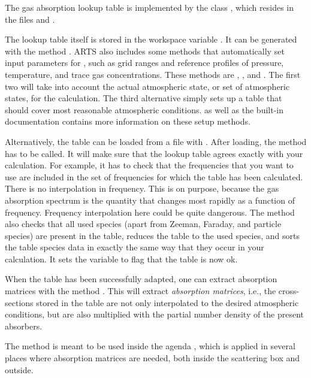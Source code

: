 The gas absorption lookup table is implemented by the class
, which resides in the files
 and .

The lookup table itself is stored in the workspace variable
.  It can be generated with the method
.  ARTS also includes some methods that
automatically set input parameters for ,
such as grid ranges and reference profiles of pressure, temperature,
and trace gas concentrations.  These methods are
, , and
.  The first two will take into account
the actual atmospheric state, or set of atmospheric states, for the
calculation. The third alternative simply sets up a table that should
cover most reasonable atmospheric conditions.
\citet{buehler:absor:11} as well as the built-in documentation contains more
information on these setup methods.

Alternatively, the table can be loaded from a file with
.  After loading, the method
 has to be called. It will make sure that
the lookup table agrees exactly with your calculation. For example, it
has to check that the frequencies that you want to use are included in
the set of frequencies for which the table has been calculated.  There
is no interpolation in frequency. This is on purpose, because the gas
absorption spectrum is the quantity that changes most rapidly as a
function of frequency. Frequency interpolation here could be quite
dangerous. The  method also checks that all used
species (apart from Zeeman, Faraday, and particle species) are present in the
table, reduces the table to the used species, and sorts the table species data in
exactly the same way that they occur in your calculation. It sets the variable
 to flag that the table is now ok. 

When the table has been successfully adapted, one can extract
absorption matrices with the method
. This will extract
\emph{absorption matrices}, i.e., the cross-sections stored in the
table are not only interpolated to the desired atmospheric conditions,
but are also multiplied with the partial number density of the present
absorbers.

The  method is meant to
be used inside the agenda ,
which is applied in several places where absorption matrices are
needed, both inside the scattering box and outside.

